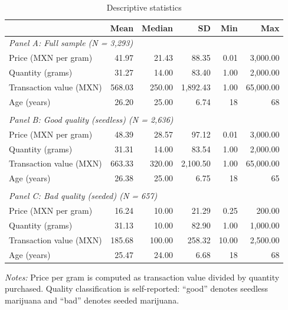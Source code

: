 \begin{table}[H]
\centering
\caption{Descriptive statistics}
\label{tab:descriptive}
\begin{threeparttable}
\begin{tabular}{lrrrrr}
\toprule
 & Mean & Median & SD & Min & Max \\
\midrule
\multicolumn{6}{l}{\textit{Panel A: Full sample (N = 3,293)}} \\[3pt]
Price (MXN per gram)   & 41.97 & 21.43 & 88.35 & 0.01 & 3,000.00 \\
Quantity (grams)       & 31.27 & 14.00 & 83.40 & 1.00 & 2,000.00 \\
Transaction value (MXN)& 568.03 & 250.00 & 1,892.43 & 1.00 & 65,000.00 \\
Age (years)            & 26.20 & 25.00 & 6.74 & 18 & 68 \\
\\[6pt]
\multicolumn{6}{l}{\textit{Panel B: Good quality (seedless) (N = 2,636)}} \\[3pt]
Price (MXN per gram)   & 48.39 & 28.57 & 97.12 & 0.01 & 3,000.00 \\
Quantity (grams)       & 31.31 & 14.00 & 83.54 & 1.00 & 2,000.00 \\
Transaction value (MXN)& 663.33 & 320.00 & 2,100.50 & 1.00 & 65,000.00 \\
Age (years)            & 26.38 & 25.00 & 6.75 & 18 & 65 \\
\\[6pt]
\multicolumn{6}{l}{\textit{Panel C: Bad quality (seeded) (N = 657)}} \\[3pt]
Price (MXN per gram)   & 16.24 & 10.00 & 21.29 & 0.25 & 200.00 \\
Quantity (grams)       & 31.13 & 10.00 & 82.90 & 1.00 & 1,000.00 \\
Transaction value (MXN)& 185.68 & 100.00 & 258.32 & 10.00 & 2,500.00 \\
Age (years)            & 25.47 & 24.00 & 6.68 & 18 & 68 \\
\bottomrule
\end{tabular}
\begin{tablenotes}[flushleft]\small
\item \textit{Notes:} Price per gram is computed as transaction value divided by quantity purchased.  Quality classification is self-reported: ``good'' denotes seedless marijuana and ``bad'' denotes seeded marijuana.
\end{tablenotes}
\end{threeparttable}
\end{table}
